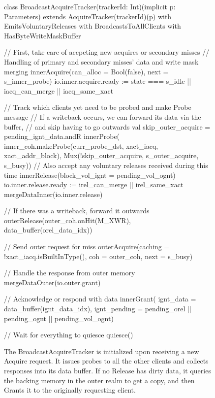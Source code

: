 \begin{figure}
\centering
\begin{scala}
class BroadcastAcquireTracker(trackerId: Int)(implicit p: Parameters)
    extends AcquireTracker(trackerId)(p)
    with EmitsVoluntaryReleases
    with BroadcastsToAllClients
    with HasByteWriteMaskBuffer {
  // First, take care of accpeting new acquires or secondary misses
  // Handling of primary and secondary misses' data and write mask merging
  innerAcquire(can_alloc = Bool(false), next = s_inner_probe)
  io.inner.acquire.ready := state === s_idle || iacq_can_merge || iacq_same_xact
  
  // Track which clients yet need to be probed and make Probe message
  // If a writeback occurs, we can forward its data via the buffer,
  // and skip having to go outwards
  val skip_outer_acquire = pending_ignt_data.andR
  innerProbe(
    inner_coh.makeProbe(curr_probe_dst, xact_iacq, xact_addr_block),
    Mux(!skip_outer_acquire, s_outer_acquire, s_busy))
  // Also accept any voluntary releases received during this time
  innerRelease(block_vol_ignt = pending_vol_ognt)
  io.inner.release.ready := irel_can_merge || irel_same_xact
  mergeDataInner(io.inner.release)

  // If there was a writeback, forward it outwards
  outerRelease(outer_coh.onHit(M_XWR), data_buffer(orel_data_idx))

  // Send outer request for miss
  outerAcquire(caching = !xact_iacq.isBuiltInType(), coh = outer_coh, next = s_busy)

  // Handle the response from outer memory
  mergeDataOuter(io.outer.grant)

  // Acknowledge or respond with data
  innerGrant(
    ignt_data = data_buffer(ignt_data_idx),
    ignt_pending = pending_orel || pending_ognt || pending_vol_ognt)

  // Wait for everything to quiesce
  quiesce()
}
\end{scala} 
\caption[The BroadcastAcquireTracker.]{
The BroadcastAcquireTracker is initialized upon receiving a new Acquire request.
It issues probes to all the other clients and collects responses into its data buffer.
If no Release has dirty data, it queries the backing memory in the outer realm to get a copy,
and then Grants it to the originally requesting client.
}
\label{fig:acqtracker}
\end{figure}

